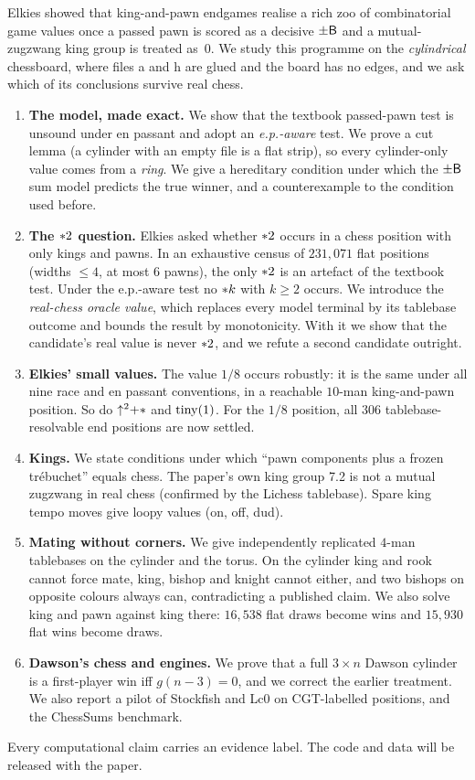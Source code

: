 Elkies showed that king-and-pawn endgames realise a rich zoo of combinatorial game values once a
passed pawn is scored as a decisive $\pm\mathsf{B}$ and a mutual-zugzwang king group is treated as~$0$.
We study this programme on the \emph{cylindrical} chessboard, where files a and h are glued and the board has
no edges, and we ask which of its conclusions survive real chess.
\begin{enumerate}[label=(\roman*),leftmargin=*]
\item \textbf{The model, made exact.} We show that the textbook passed-pawn test is unsound under en passant
  and adopt an \emph{e.p.-aware} test. We prove a cut lemma (a cylinder with an empty file is a flat strip),
  so every cylinder-only value comes from a \emph{ring}. We give a hereditary condition under which the
  $\pm\mathsf{B}$ sum model predicts the true winner, and a counterexample to the condition used before.
\item \textbf{The $\mathord{\ast 2}$ question.} Elkies asked whether $\mathord{\ast 2}$ occurs in a chess position with only
  kings and pawns. In an exhaustive census of $231{,}071$ flat positions (widths $\le 4$, at most $6$ pawns),
  the only $\mathord{\ast 2}$ is an artefact of the textbook test. Under the e.p.-aware test no $\mathord{\ast k}$ with
  $k\ge2$ occurs. We introduce the \emph{real-chess oracle value}, which replaces every model terminal by its
  tablebase outcome and bounds the result by monotonicity. With it we show that the candidate's real value is
  never $\mathord{\ast 2}$, and we refute a second candidate outright.
\item \textbf{Elkies' small values.} The value $1/8$ occurs robustly: it is the same under all nine race and
  en passant conventions, in a reachable $10$-man king-and-pawn position. So do $\mathord{\uparrow^{2}}{+}\mathord{\ast}$ and
  $\operatorname{tiny}(1)$. For the $1/8$ position, all $306$ tablebase-resolvable end positions are now settled.
\item \textbf{Kings.} We state conditions under which ``pawn components plus a frozen tr\'ebuchet'' equals
  chess. The paper's own king group 7.2 is not a mutual zugzwang in real chess (confirmed by the Lichess
  tablebase). Spare king tempo moves give loopy values (\textsf{on}, \textsf{off}, \textsf{dud}).
\item \textbf{Mating without corners.} We give independently replicated $4$-man tablebases on the cylinder and
  the torus. On the cylinder king and rook cannot force mate, king, bishop and knight cannot either, and two
  bishops on opposite colours always can, contradicting a published claim. We also solve king and pawn
  against king there: $16{,}538$ flat draws become wins and $15{,}930$ flat wins become draws.
\item \textbf{Dawson's chess and engines.} We prove that a full $3\times n$ Dawson cylinder is a first-player
  win iff $g(n-3)=0$, and we correct the earlier treatment. We also report a pilot of Stockfish and Lc0 on
  CGT-labelled positions, and the ChessSums benchmark.
\end{enumerate}
Every computational claim carries an evidence label. The code and data will be released with the paper.
